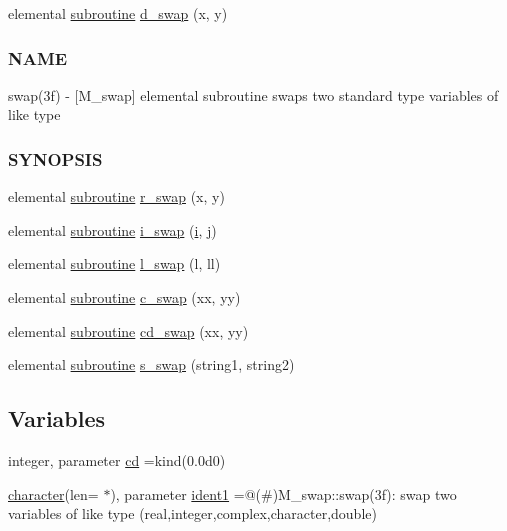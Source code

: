 \begin{DoxyCompactItemize}
\item 
elemental \hyperlink{M__stopwatch_83_8txt_acfbcff50169d691ff02d4a123ed70482}{subroutine} \hyperlink{namespacem__swap_a73a5ecd37d14f30520e204bb906734c0}{d\+\_\+swap} (x, y)
\begin{DoxyCompactList}\small\item\em \subsubsection*{N\+A\+ME}

swap(3f) -\/ \mbox{[}M\+\_\+swap\mbox{]} elemental subroutine swaps two standard type variables of like type \subsubsection*{S\+Y\+N\+O\+P\+S\+IS}\end{DoxyCompactList}\item 
elemental \hyperlink{M__stopwatch_83_8txt_acfbcff50169d691ff02d4a123ed70482}{subroutine} \hyperlink{namespacem__swap_a8404b842cf10433585d21bddb67c0269}{r\+\_\+swap} (x, y)
\item 
elemental \hyperlink{M__stopwatch_83_8txt_acfbcff50169d691ff02d4a123ed70482}{subroutine} \hyperlink{namespacem__swap_ac8e4f4c4892b543c110823934032791f}{i\+\_\+swap} (\hyperlink{intro__blas1_83_8txt_a8ba82a50c0c2c12d5f6a77f7e4651c0b}{i}, \hyperlink{exit_87_8txt_a8921ef29c441e427867c54bd3b2462ba}{j})
\item 
elemental \hyperlink{M__stopwatch_83_8txt_acfbcff50169d691ff02d4a123ed70482}{subroutine} \hyperlink{namespacem__swap_a3d204834a7c6cea08aef9387c680a90e}{l\+\_\+swap} (l, ll)
\item 
elemental \hyperlink{M__stopwatch_83_8txt_acfbcff50169d691ff02d4a123ed70482}{subroutine} \hyperlink{namespacem__swap_a2353a772e3ac1242164631a9ec75f981}{c\+\_\+swap} (xx, yy)
\item 
elemental \hyperlink{M__stopwatch_83_8txt_acfbcff50169d691ff02d4a123ed70482}{subroutine} \hyperlink{namespacem__swap_a7961e38856c3c44276520f6543b609b7}{cd\+\_\+swap} (xx, yy)
\item 
elemental \hyperlink{M__stopwatch_83_8txt_acfbcff50169d691ff02d4a123ed70482}{subroutine} \hyperlink{namespacem__swap_a10156a985cf314b706164ec3f773bd0f}{s\+\_\+swap} (string1, string2)
\end{DoxyCompactItemize}
\subsection*{Variables}
\begin{DoxyCompactItemize}
\item 
integer, parameter \hyperlink{namespacem__swap_af14229bde3625fba5d65e401fd16c3d1}{cd} =kind(0.\+0d0)
\item 
\hyperlink{option__stopwatch_83_8txt_abd4b21fbbd175834027b5224bfe97e66}{character}(len= $\ast$), parameter \hyperlink{namespacem__swap_a01034a0ba775ff397c911bd715dd6d3f}{ident1} =\textquotesingle{}@(\#)M\+\_\+swap\+::swap(3f)\+: swap two variables of like type (real,integer,complex,character,double)\textquotesingle{}
\end{DoxyCompactItemize}


